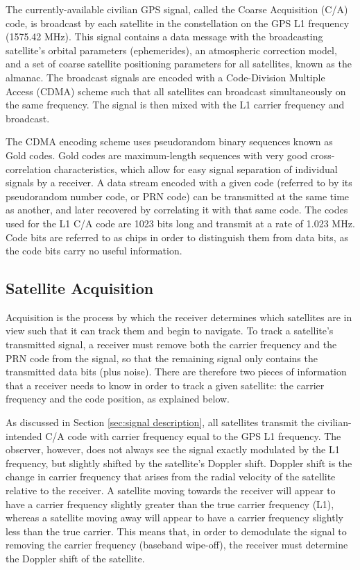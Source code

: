 \documentclass[12pt]{article}
\begin{document}
The currently-available civilian GPS signal, called the Coarse Acquisition (C/A) code, is broadcast by each satellite in the constellation on the GPS L1 frequency (1575.42 MHz). This signal contains a data message with the broadcasting satellite's orbital parameters (ephemerides), an atmospheric correction model, and a set of coarse satellite positioning parameters for all satellites, known as the almanac. The broadcast signals are encoded with a Code-Division Multiple Access (CDMA) scheme such that all satellites can broadcast simultaneously on the same frequency. The signal is then mixed with the L1 carrier frequency and broadcast.

The CDMA encoding scheme uses pseudorandom binary sequences known as Gold codes. Gold codes are maximum-length sequences with very good cross-correlation characteristics, which allow for easy signal separation of individual signals by a receiver. A data stream encoded with a given code (referred to by its pseudorandom number code, or PRN code) can be transmitted at the same time as another, and later recovered by correlating it with that same code. The codes used for the L1 C/A code are 1023 bits long and transmit at a rate of 1.023 MHz. Code bits are referred to as chips in order to distinguish them from data bits, as the code bits carry no useful information.

\subsection{Satellite Acquisition}
\label{sec:acquisition}
Acquisition is the process by which the receiver determines which satellites are in view such that it can track them and begin to navigate. To track a satellite's transmitted signal, a receiver must remove both the carrier frequency and the PRN code from the signal, so that the remaining signal only contains the transmitted data bits (plus noise). There are therefore two pieces of information that a receiver needs to know in order to track a given satellite: the carrier frequency and the code position, as explained below.

As discussed in Section \ref{sec:signal description}, all satellites transmit the civilian-intended C/A code with carrier frequency equal to the GPS L1 frequency. The observer, however, does not always see the signal exactly modulated by the L1 frequency, but slightly shifted by the satellite's Doppler shift. Doppler shift is the change in carrier frequency that arises from the radial velocity of the satellite relative to the receiver. A satellite moving towards the receiver will appear to have a carrier frequency slightly greater than the true carrier frequency (L1), whereas a satellite moving away will appear to have a carrier frequency slightly less than the true carrier. This means that, in order to demodulate the signal to removing the carrier frequency (baseband wipe-off), the receiver must determine the Doppler shift of the satellite.
\end{document}
